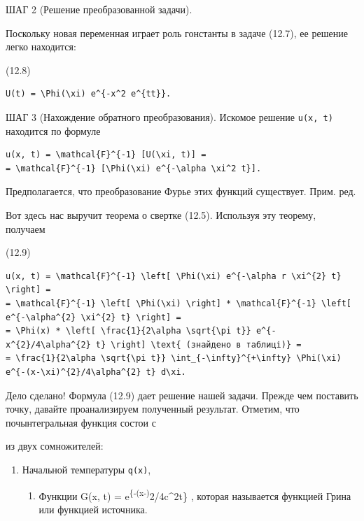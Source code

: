 \documentclass[
  ukrainian,
]{article}
\providecommand{\tightlist}{%
  \setlength{\itemsep}{0pt}\setlength{\parskip}{0pt}}
\begin{document}
ШАГ 2 (Решение преобразованной задачи).

Поскольку новая переменная играет роль гонстанты в задаче (12.7), ее
решение легко находится:

(12.8)

\begin{verbatim}
U(t) = \Phi(\xi) e^{-x^2 e^{tt}}.
\end{verbatim}

ШАГ 3 (Нахождение обратного преобразования). Искомое решение
\texttt{u(x,\ t)} находится по формуле

\begin{verbatim}
u(x, t) = \mathcal{F}^{-1} [U(\xi, t)] =
= \mathcal{F}^{-1} [\Phi(\xi) e^{-\alpha \xi^2 t}].
\end{verbatim}

Предполагается, что преобразование Фурье этих функций существует. Прим.
ред.

Вот здесь нас выручит теорема о свертке (12.5). Используя эту теорему,
получаем

(12.9)

\begin{verbatim}
u(x, t) = \mathcal{F}^{-1} \left[ \Phi(\xi) e^{-\alpha r \xi^{2} t} \right] =
= \mathcal{F}^{-1} \left[ \Phi(\xi) \right] * \mathcal{F}^{-1} \left[ e^{-\alpha^{2} \xi^{2} t} \right] =
= \Phi(x) * \left[ \frac{1}{2\alpha \sqrt{\pi t}} e^{-x^{2}/4\alpha^{2} t} \right] \text{ (знайдено в таблиці)} =
= \frac{1}{2\alpha \sqrt{\pi t}} \int_{-\infty}^{+\infty} \Phi(\xi) e^{-(x-\xi)^{2}/4\alpha^{2} t} d\xi.
\end{verbatim}

Дело сделано! Формула (12.9) дает решение нашей задачи. Прежде чем
поставить точку, давайте проанализируем полученный результат. Отметим,
что почынтегральная функция состои с

из двух сомножителей:

\begin{enumerate}
\def\labelenumi{\arabic{enumi}.}
\item
  Начальной температуры \texttt{q(x)},

  \begin{enumerate}
  \def\labelenumii{\arabic{enumii}.}
  \setcounter{enumii}{1}
  \tightlist
  \item
    Функции G(x, t) = 
    e\textsuperscript{\{-(x-\xi)}2/4c\^{}2t\} , которая называется
    функцией Грина или функцией источника.
  \end{enumerate}
\end{enumerate}
\end{document}
